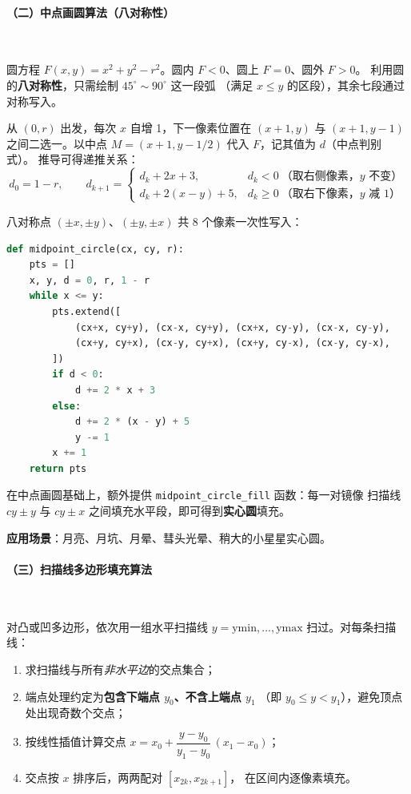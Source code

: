 \documentclass[12pt, a4paper]{article}
\begin{document}
\paragraph{（二）中点画圆算法（八对称性）}~

圆方程 $F(x, y) = x^2 + y^2 - r^2$。圆内 $F < 0$、圆上 $F = 0$、圆外 $F > 0$。
利用圆的\textbf{八对称性}，只需绘制 $45^\circ \sim 90^\circ$ 这一段弧
（满足 $x \le y$ 的区段），其余七段通过对称写入。

从 $(0, r)$ 出发，每次 $x$ 自增 1，下一像素位置在 $(x+1, y)$ 与 $(x+1, y-1)$
之间二选一。以中点 $M = (x+1, y - 1/2)$ 代入 $F$，记其值为 $d$（中点判别式）。
推导可得递推关系：
\[
d_0 = 1 - r,\qquad
d_{k+1} =
\begin{cases}
d_k + 2x + 3, & d_k < 0\ \text{（取右侧像素，}y\text{ 不变）} \\
d_k + 2(x - y) + 5, & d_k \ge 0\ \text{（取右下像素，}y\text{ 减 1）}
\end{cases}
\]

八对称点 $(\pm x, \pm y)$、$(\pm y, \pm x)$ 共 8 个像素一次性写入：

\begin{lstlisting}[language=Python, caption={中点画圆（algorithms.py 摘录）}, label=lst:midpoint]
def midpoint_circle(cx, cy, r):
    pts = []
    x, y, d = 0, r, 1 - r
    while x <= y:
        pts.extend([
            (cx+x, cy+y), (cx-x, cy+y), (cx+x, cy-y), (cx-x, cy-y),
            (cx+y, cy+x), (cx-y, cy+x), (cx+y, cy-x), (cx-y, cy-x),
        ])
        if d < 0:
            d += 2 * x + 3
        else:
            d += 2 * (x - y) + 5
            y -= 1
        x += 1
    return pts
\end{lstlisting}

在中点画圆基础上，额外提供 \texttt{midpoint\_circle\_fill} 函数：每一对镜像
扫描线 $cy \pm y$ 与 $cy \pm x$ 之间填充水平段，即可得到\textbf{实心圆}填充。

\textbf{应用场景}：月亮、月坑、月晕、彗头光晕、稍大的小星星实心圆。

\paragraph{（三）扫描线多边形填充算法}~

对凸或凹多边形，依次用一组水平扫描线 $y = \mathrm{ymin}, \ldots, \mathrm{ymax}$
扫过。对每条扫描线：

\begin{enumerate}[label=（\arabic*）, leftmargin=*]
    \item 求扫描线与所有\textit{非水平边}的交点集合；
    \item 端点处理约定为\textbf{包含下端点 $y_0$、不含上端点 $y_1$}
    （即 $y_0 \le y < y_1$），避免顶点处出现奇数个交点；
    \item 按线性插值计算交点 $x = x_0 + \dfrac{y - y_0}{y_1 - y_0}\,(x_1 - x_0)$；
    \item 交点按 $x$ 排序后，两两配对 $[x_{2k}, x_{2k+1}]$，
    在区间内逐像素填充。
\end{enumerate}
\end{document}
